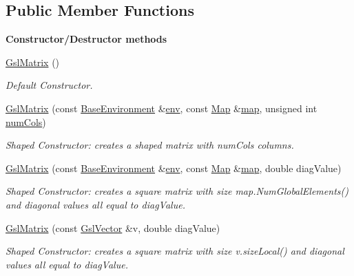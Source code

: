 \subsection*{Public Member Functions}
\begin{Indent}{\bf Constructor/\-Destructor methods}\par
\begin{DoxyCompactItemize}
\item 
\hyperlink{class_q_u_e_s_o_1_1_gsl_matrix_af84a9a1a8ff36c5000831f5348551b1a}{Gsl\-Matrix} ()
\begin{DoxyCompactList}\small\item\em Default Constructor. \end{DoxyCompactList}\item 
\hyperlink{class_q_u_e_s_o_1_1_gsl_matrix_a393780d154e02c6ff2ae8e6282335cbf}{Gsl\-Matrix} (const \hyperlink{class_q_u_e_s_o_1_1_base_environment}{Base\-Environment} \&\hyperlink{class_q_u_e_s_o_1_1_matrix_a1eefeca9f35200e8275fb0fdfa0c8684}{env}, const \hyperlink{class_q_u_e_s_o_1_1_map}{Map} \&\hyperlink{class_q_u_e_s_o_1_1_matrix_ae01c72255466cd95201bb4c7f07e1b83}{map}, unsigned int \hyperlink{class_q_u_e_s_o_1_1_gsl_matrix_ad5005f168fe030468e834776afb1859b}{num\-Cols})
\begin{DoxyCompactList}\small\item\em Shaped Constructor\-: creates a shaped matrix with {\ttfamily num\-Cols} columns. \end{DoxyCompactList}\item 
\hyperlink{class_q_u_e_s_o_1_1_gsl_matrix_a6fd94d46f9c241bac85829eb74079104}{Gsl\-Matrix} (const \hyperlink{class_q_u_e_s_o_1_1_base_environment}{Base\-Environment} \&\hyperlink{class_q_u_e_s_o_1_1_matrix_a1eefeca9f35200e8275fb0fdfa0c8684}{env}, const \hyperlink{class_q_u_e_s_o_1_1_map}{Map} \&\hyperlink{class_q_u_e_s_o_1_1_matrix_ae01c72255466cd95201bb4c7f07e1b83}{map}, double diag\-Value)
\begin{DoxyCompactList}\small\item\em Shaped Constructor\-: creates a square matrix with size {\ttfamily map.\-Num\-Global\-Elements()} and diagonal values all equal to {\ttfamily diag\-Value}. \end{DoxyCompactList}\item 
\hyperlink{class_q_u_e_s_o_1_1_gsl_matrix_aada96f50a59a8f9058a1842b0037b510}{Gsl\-Matrix} (const \hyperlink{class_q_u_e_s_o_1_1_gsl_vector}{Gsl\-Vector} \&v, double diag\-Value)
\begin{DoxyCompactList}\small\item\em Shaped Constructor\-: creates a square matrix with size {\ttfamily v.\-size\-Local()} and diagonal values all equal to {\ttfamily diag\-Value}. \end{DoxyCompactList}\item 

\end{DoxyCompactItemize}
\end{Indent}

